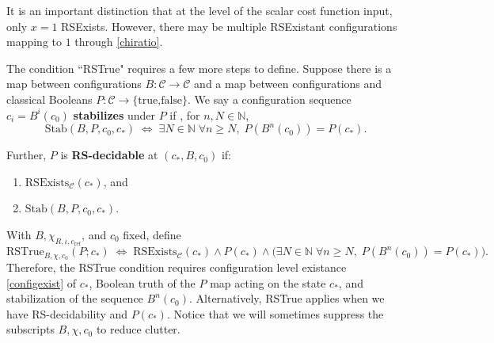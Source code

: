 \documentclass[11pt,a4paper]{article}
\newcommand{\RSExists}{\mathrm{RSExists}}
\newcommand{\RSTrue}{\mathrm{RSTrue}}
\newcommand{\Stab}{\mathrm{Stab}}
\newcommand{\Ccfg}{\mathcal{C}}
\begin{document}
It is an important distinction that at the level of the scalar cost function input, only $x=1$ RSExists. However, there may be multiple RSExistant configurations mapping to $1$ through \ref{chiratio}.

The condition ``RSTrue" requires a few more steps to define. Suppose there is a map between configurations $B: \mathcal{C}\rightarrow \mathcal{C}$ and a map between configurations and classical Booleans $P:\mathcal{C}\rightarrow\{\text{true,false}\}$. We say a configuration sequence $c_i=B^i(c_0)$ \textbf{stabilizes} under $P$ if , for $n,N\in\mathbb{N}$,
\begin{equation}
    \Stab(B,P,c_0,c_*)
  \;\Longleftrightarrow\;
  \exists N\in\mathbb{N}\;\forall n\ge N,\;
  P(B^n(c_0)) = P(c_*).
  \label{stabdef}
\end{equation}

Further, $P$ is \textbf{RS-decidable} at $(c_*,B,c_0)$ if:
\begin{enumerate}
  \item $\RSExists_\Ccfg(c_*)$, and
  \item $\Stab(B,P,c_0,c_*)$.
\end{enumerate}

With \(B,\chi_{R,\iota,c_{\mathrm{ref}}}\), and \(c_0\) fixed, define
\begin{equation}
  \RSTrue_{B,\chi,c_0}(P;c_*)
  \;\Longleftrightarrow\;
  \RSExists_{\Ccfg}(c_*)
  \land P(c_*)
  \land\Big(\exists N\in\mathbb{N}\;\forall n\ge N,\; P(B^n(c_0))=P(c_*)\Big).
\end{equation}
Therefore, the RSTrue condition requires configuration level existance \ref{configexist} of $c_*$, Boolean truth of the $P$ map acting on the state $c_*$, and stabilization of the sequence $B^n(c_0)$. Alternatively, RSTrue applies when we have RS-decidability and $P(c_*)$. Notice that we will sometimes suppress the subscripts $B,\chi,c_0$ to reduce clutter.
\end{document}
